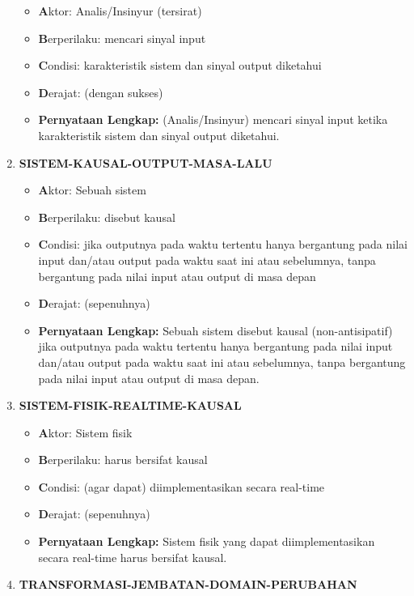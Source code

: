 \documentclass[
  letterpaper,
  DIV=11,
  numbers=noendperiod]{scrreprt}
\begin{document}
\begin{enumerate}
  \begin{itemize}
  \item
    \textbf{A}ktor: Analis/Insinyur (tersirat)
  \item
    \textbf{B}erperilaku: mencari sinyal input
  \item
    \textbf{C}ondisi: karakteristik sistem dan sinyal output diketahui
  \item
    \textbf{D}erajat: (dengan sukses)
  \item
    \textbf{Pernyataan Lengkap:} (Analis/Insinyur) mencari sinyal input
    ketika karakteristik sistem dan sinyal output diketahui.
  \end{itemize}
\item
  \textbf{SISTEM-KAUSAL-OUTPUT-MASA-LALU}

  \begin{itemize}
  \item
    \textbf{A}ktor: Sebuah sistem
  \item
    \textbf{B}erperilaku: disebut kausal
  \item
    \textbf{C}ondisi: jika outputnya pada waktu tertentu hanya
    bergantung pada nilai input dan/atau output pada waktu saat ini atau
    sebelumnya, tanpa bergantung pada nilai input atau output di masa
    depan
  \item
    \textbf{D}erajat: (sepenuhnya)
  \item
    \textbf{Pernyataan Lengkap:} Sebuah sistem disebut kausal
    (non-antisipatif) jika outputnya pada waktu tertentu hanya
    bergantung pada nilai input dan/atau output pada waktu saat ini atau
    sebelumnya, tanpa bergantung pada nilai input atau output di masa
    depan.
  \end{itemize}
\item
  \textbf{SISTEM-FISIK-REALTIME-KAUSAL}

  \begin{itemize}
  \item
    \textbf{A}ktor: Sistem fisik
  \item
    \textbf{B}erperilaku: harus bersifat kausal
  \item
    \textbf{C}ondisi: (agar dapat) diimplementasikan secara real-time
  \item
    \textbf{D}erajat: (sepenuhnya)
  \item
    \textbf{Pernyataan Lengkap:} Sistem fisik yang dapat
    diimplementasikan secara real-time harus bersifat kausal.
  \end{itemize}
\item
  \textbf{TRANSFORMASI-JEMBATAN-DOMAIN-PERUBAHAN}


\end{enumerate}
\end{document}

